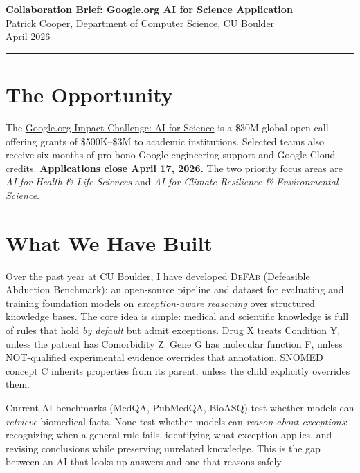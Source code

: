 \documentclass[11pt]{article}
\begin{document}
\begin{center}
{\Large\bfseries Collaboration Brief: Google.org AI for Science Application}\\[4pt]
{\normalsize Patrick Cooper, Department of Computer Science, CU Boulder}\\[2pt]
{\small April 2026}
\end{center}

\vspace{-4pt}
\hrule
\vspace{6pt}

\section*{The Opportunity}

The \href{https://www.google.org/impact-challenges/ai-science/}{Google.org Impact Challenge: AI for Science} is a \$30M global open call offering grants of \$500K--\$3M to academic institutions. Selected teams also receive six months of pro bono Google engineering support and Google Cloud credits. \textbf{Applications close April 17, 2026.} The two priority focus areas are \emph{AI for Health \& Life Sciences} and \emph{AI for Climate Resilience \& Environmental Science}.

\section*{What We Have Built}

Over the past year at CU Boulder, I have developed \textsc{DeFAb} (Defeasible Abduction Benchmark): an open-source pipeline and dataset for evaluating and training foundation models on \emph{exception-aware reasoning} over structured knowledge bases. The core idea is simple: medical and scientific knowledge is full of rules that hold \emph{by default} but admit exceptions. Drug X treats Condition Y, unless the patient has Comorbidity Z. Gene G has molecular function F, unless NOT-qualified experimental evidence overrides that annotation. SNOMED concept C inherits properties from its parent, unless the child explicitly overrides them.

Current AI benchmarks (MedQA, PubMedQA, BioASQ) test whether models can \emph{retrieve} biomedical facts. None test whether models can \emph{reason about exceptions}: recognizing when a general rule fails, identifying what exception applies, and revising conclusions while preserving unrelated knowledge. This is the gap between an AI that looks up answers and one that reasons safely.
\end{document}
